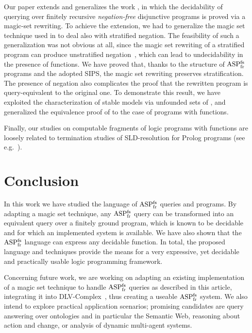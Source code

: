 \documentclass{tlp}
\newcommand{\nop}[1]{}
\newcommand{\dlv}{{\sc DLV}\xspace}
\newcommand{\ASPFNFR}{\ensuremath{\rm ASP^{\rm fs}_{\rm fr}}}
\begin{document}
Our paper extends and generalizes the work \cite{cali-etal-2009-lpnmr},
in which the decidability of querying over finitely recursive {\em negation-free}
disjunctive programs is proved via a magic-set rewriting.
To achieve the extension, we had to generalize the magic set technique
used in \cite{cali-etal-2009-lpnmr} to deal also with stratified negation.
The feasibility of such a generalization was not obvious at all,
since the magic set rewriting of a stratified program can produce unstratified
negation~\cite{kemp-etal-95},
which can lead to undecidability in the presence of functions.
We have proved that, thanks to the structure of \ASPFNFR{} programs and the adopted SIPS,
the magic set rewriting preserves stratification.
The presence of negation also complicates the proof that the 
rewritten program is query-equivalent to the original one.
To demonstrate this result, we have exploited the characterization
of stable models via unfounded sets of \cite{leon-etal-97b},
and generalized the equivalence proof of \cite{alvi-etal-2009-TR}
to the case of programs with functions.


Finally, our studies on computable fragments of logic
programs with functions are loosely related to termination
studies of SLD-resolution for Prolog programs (see
e.g.~\cite{bruy-etal-2007-acm}).

\nop{
Some other papers about the magic-set
technique~\cite{banc-etal-1986,ullm-89,beer-rama-87}
are related to the present work as well, for which
different extensions and refinements have been proposed.
Among the more recent works, an adaptation for
soft-stratifiable programs~\cite{behr-2003-pods}, the
generalization to the disjunctive
case~\cite{cumb-etal-2004-iclp} and to Datalog with
(possibly unstratified) negation~\cite{fabe-etal-2007-jcss}
are worth remembering.
}


\section{Conclusion}\label{sec:conclusion}

In this work we have studied the language of \ASPFNFR{} queries and
programs. By adapting a magic set technique, any \ASPFNFR{} query can be
transformed into an equivalent query over a finitely ground
program, which is known to be decidable and for which an implemented
system is available. We have also shown that the \ASPFNFR{} language can
express any decidable function. In total, the proposed language and
techniques provide the means for a very expressive, yet decidable
and practically usable logic programming framework.

Concerning future work, we are working on adapting an existing
implementation of a magic set technique to handle \ASPFNFR{} queries
as described in this article, integrating it into
\dlv-Complex~\cite{dlvcomplex-web}, thus creating a useable \ASPFNFR{}
system. We also intend to explore practical application scenarios;
promising candidates are query answering over ontologies and in
particular the Semantic Web, reasoning about action and change, or
analysis of dynamic multi-agent systems.


\end{document}
